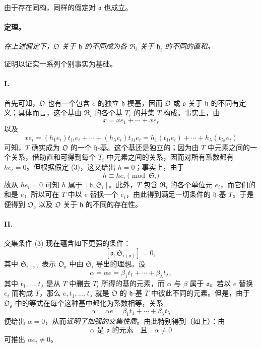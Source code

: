 \documentclass[11pt]{article}
\begin{document}
由于存在同构，同样的假定对 $\mathfrak o$ 也成立。

\paragraph{定理。}
\emph{在上述假定下，$\mathfrak O$ 关于 $\mathfrak h$ 的不同成为各 $\mathfrak R_i$ 关于 $\mathfrak h_i$ 的不同的直和。}

证明以证实一系列个别事实为基础。

\paragraph{I.}
首先可知，$\mathfrak O$ 也有一个包含 $e$ 的独立 $\mathfrak h$-模基，因而 $\mathfrak O$ 或 $\mathfrak o$ 关于 $\mathfrak h$ 的不同有定义；具体而言，这个基由 $\mathfrak R_i$ 的各个基 $T_i$ 的并集 $T$ 构成。事实上，由
\[
x=xe_1+\cdots+xe_r
\]
以及
\[
xe_i=(h_1e_i)t_{1i}e_i+\cdots+(h_\lambda e_i)t_{\lambda i}e_i
=h_1(t_{1i}e_i)+\cdots+h_\lambda(t_{\lambda i}e_i)
\]
可知，$T$ 确实成为 $\mathfrak O$ 的一个 $\mathfrak h$-基。这个基还是独立的；因为由 $T$ 中元素之间的一个关系，借助直和可得到每个 $T_i$ 中元素之间的关系，因而对所有系数都有 $h e_i=0$。但根据假定 (3)，这又给出 $h=0$；事实上，由于
\[
h\equiv h e_i\pmod{\mathfrak S_i}
\]
故从 $h e_i=0$ 可知 $h$ 属于 $[\mathfrak h,\mathfrak S_i]$。此外，$T$ 包含 $\mathfrak R_i$ 的各个单位元 $e_i$，而它们的和是 $e$，所以可在 $T$ 中以 $e$ 替换一个 $e_i$，由此得到满足一切条件的 $\mathfrak h$-基 $\overline T$。于是便得到 $\mathfrak O_{\mathfrak o}$ 以及 $\mathfrak O$ 关于 $\mathfrak h$ 的不同的存在性。

\paragraph{II.}
交集条件 (3) 现在蕴含如下更强的条件：
\[
[\mathfrak o,\mathfrak S_{i(\mathfrak o)}]=0,
\]
其中 $\mathfrak S_{i(\mathfrak o)}$ 表示 $\mathfrak O_{\mathfrak o}$ 中由 $\mathfrak S_i$ 导出的理想。设
\[
\alpha=\alpha e=\beta_1t_1+\cdots+\beta_\lambda t_\lambda,
\]
其中 $t_1,\ldots,t_\lambda$ 是从 $T$ 中删去 $T_i$ 所得的基的元素，而 $\alpha$ 与 $\beta$ 属于 $\mathfrak o$。若以 $e$ 替换 $e_i$ 而构成 $\overline T$，那么 $e,t_1,\ldots,t_\lambda$ 就是 $\mathfrak O$ 的 $\mathfrak h$-基 $\overline T$ 中彼此不同的元素。但是，由于 $\mathfrak O_{\mathfrak o}$ 中的等式在每个这种基中都化为系数相等，关系
\[
\alpha=\alpha e=\beta_1t_1+\cdots+\beta_\lambda t_\lambda
\]
便给出 $\alpha=0$，从而\emph{证明了加强的交集性质}。由此特别得到（如上）：由
\[
\alpha\text{ 是 }\mathfrak o\text{ 的元素}\quad\text{且}\quad\alpha\ne0
\]
可推出 $\alpha e_i\ne0$。
\end{document}

